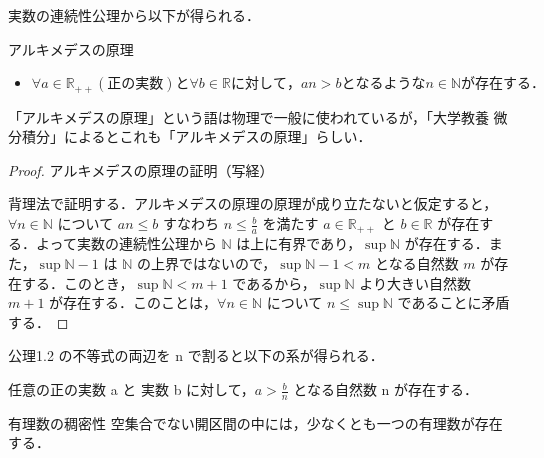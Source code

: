 \documentclass[a4paper]{ltjsarticle}
\begin{document}
実数の連続性公理から以下が得られる．
  \begin{corollary}{アルキメデスの原理}{}
   \begin{itemize}
   \item $ \forall a \in \mathbb{R} _ {++} (正の実数) と \forall b \in \mathbb{R} に対して，an > b となるような n \in \mathbb{N} が存在する．$

   \end{itemize}
  \end{corollary}
「アルキメデスの原理」という語は物理で一般に使われているが，「大学教養 微分積分」によるとこれも「アルキメデスの原理」らしい．

  \begin{proof}{アルキメデスの原理の証明（写経）}{}

   背理法で証明する．アルキメデスの原理の原理が成り立たないと仮定すると，$\forall n \in \mathbb{N}$ について $an \leq b$ すなわち $n \leq \frac{b}{a}$ を満たす $a \in \mathbb{R}_{++}$ と $b \in \mathbb{R}$ が存在する．よって実数の連続性公理から $\mathbb{N}$ は上に有界であり，$\sup \mathbb{N}$ が存在する．また，$\sup \mathbb{N} - 1$ は $\mathbb{N}$ の上界ではないので，$\sup \mathbb{N} - 1 < m$ となる自然数 $m$ が存在する．このとき，$\sup \mathbb{N} < m + 1$ であるから，$\sup \mathbb{N}$ より大きい自然数 $m + 1$ が存在する．このことは，$\forall n \in \mathbb{N}$ について $n \leq \sup \mathbb{N}$ であることに矛盾する．

  \end{proof}


 公理1.2 の不等式の両辺を n で割ると以下の系が得られる．

  \begin{corollary}{}{}
   任意の正の実数 a と 実数 b に対して，$a > \frac{b}{n}$ となる自然数 n が存在する．
  \end{corollary}

  \begin{theorem}{有理数の稠密性}{}
   空集合でない開区間の中には，少なくとも一つの有理数が存在する．
  \end{theorem}
\end{document}
